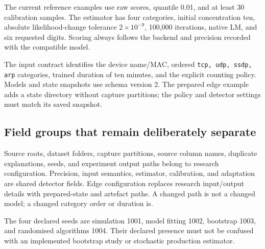 The current reference examples use raw scores, quantile 0.01, and at least
30 calibration samples. The estimator has four categories, initial
concentration ten, absolute likelihood-change tolerance $2\times10^{-9}$,
100,000 iterations, native LM, and six requested digits. Scoring always follows
the backend and precision recorded with the compatible model.

The input contract identifies the device name/MAC, ordered
\texttt{tcp, udp, ssdp, arp} categories, trained duration of ten minutes,
and the explicit counting policy. Models and state snapshots use schema
version 2. The prepared edge example adds a state directory without capture
partitions; the policy and detector settings must match its saved snapshot.

\subsection{Field groups that remain deliberately separate}

Source roots, dataset folders, capture partitions, source column names, duplicate
explanations, seeds, and experiment output paths belong to research
configuration. Precision, input semantics, estimator, calibration, and
adaptation are shared detector fields. Edge configuration replaces research
input/output details with prepared-state and artefact paths.
A changed path is not a changed model; a changed category order or duration is.

The four declared seeds are simulation 1001, model fitting 1002, bootstrap 1003,
and randomised algorithms 1004. Their declared presence must not be confused
with an implemented bootstrap study or stochastic production estimator.

